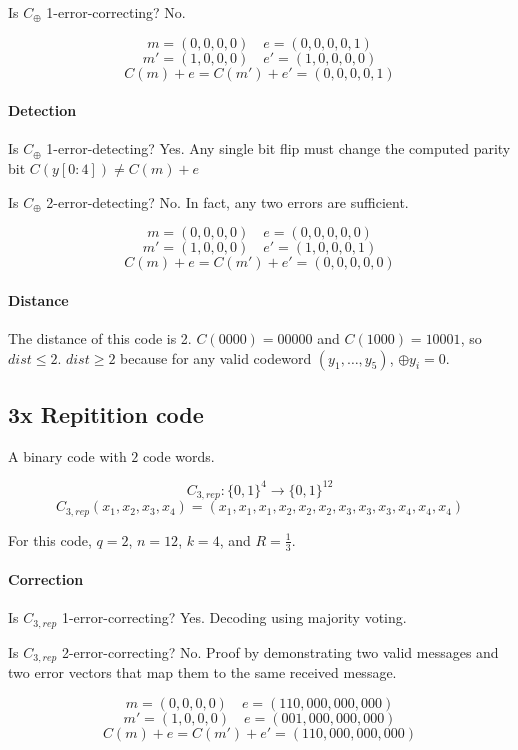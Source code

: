 \documentclass{idc_msc}
\begin{document}
Is $C_\oplus$ 1-error-correcting? No.

\[ m = (0,0,0,0) \quad e = (0,0,0,0,1) \]
\[ m' = (1,0,0,0) \quad e' = (1,0,0,0,0) \]
\[ C(m) + e = C(m') + e' = (0,0,0,0,1) \]

\paragraph{Detection}

Is $C_\oplus$ 1-error-detecting? Yes. Any single bit flip must change the computed parity bit $C(y[0:4]) \ne C(m) + e$

Is $C_\oplus$ 2-error-detecting? No. In fact, any two errors are sufficient.

\[ m = (0,0,0,0) \quad e = (0,0,0,0,0) \]
\[ m' = (1,0,0,0) \quad e' = (1,0,0,0,1) \]
\[ C(m) + e = C(m') + e' = (0,0,0,0,0) \]

\paragraph{Distance}

The distance of this code is 2. $C(0000) = 00000$ and $C(1000) = 10001$, so $dist \le 2$. $dist \ge 2$ because for any valid codeword $(y_1,\ldots,y_5)$, $\oplus y_i = 0$.



\subsection{3x Repitition code}

A binary code with $2$ code words.

\[ C_{3,rep} : \{0,1\}^4 \to \{0,1\}^{12} \]
\[ C_{3,rep}(x_1,x_2,x_3,x_4) = (x_1,x_1,x_1 ,x_2,x_2,x_2 ,x_3,x_3,x_3 ,x_4,x_4,x_4) \]

For this code, $q=2$, $n = 12$, $k = 4$, and $R=\frac{1}{3}$.

\paragraph{Correction}

Is $C_{3,rep}$ 1-error-correcting? Yes. Decoding using majority voting.

Is $C_{3,rep}$ 2-error-correcting? No.
Proof by demonstrating two valid messages and two error vectors that map them to the same received message.

\[ m = (0,0,0,0) \quad e=(110,000,000,000) \]
\[ m' = (1,0,0,0) \quad e=(001,000,000,000) \]
\[ C(m) + e = C(m') + e' = (110,000,000,000) \]
\end{document}
